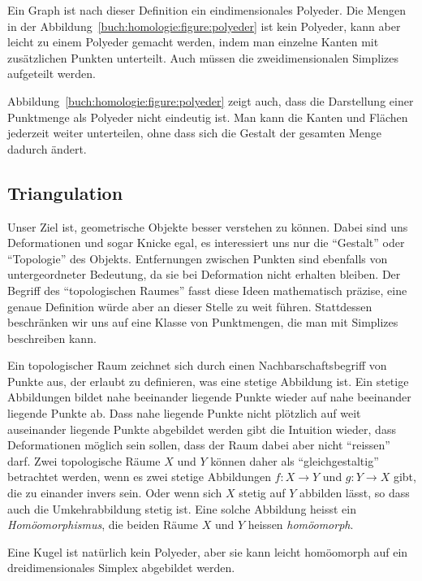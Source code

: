 Ein Graph ist nach dieser Definition ein eindimensionales Polyeder.
Die Mengen in der Abbildung~\ref{buch:homologie:figure:polyeder}
ist kein Polyeder, kann aber leicht zu einem Polyeder gemacht werden,
indem man einzelne Kanten mit zusätzlichen Punkten unterteilt.
Auch müssen die zweidimensionalen Simplizes aufgeteilt werden.

Abbildung~\ref{buch:homologie:figure:polyeder} zeigt auch, dass
die Darstellung einer Punktmenge als Polyeder nicht eindeutig ist.
Man kann die Kanten und Flächen jederzeit weiter unterteilen, ohne
dass sich die Gestalt der gesamten Menge dadurch ändert.

\subsection{Triangulation
\label{buch:subsection:triangulation}}
Unser Ziel ist, geometrische Objekte besser verstehen zu können.
Dabei sind uns Deformationen und sogar Knicke egal, es interessiert uns
nur die ``Gestalt'' oder ``Topologie'' des Objekts.
Entfernungen zwischen Punkten sind ebenfalls von untergeordneter 
Bedeutung, da sie bei Deformation nicht erhalten bleiben.
Der Begriff des ``topologischen Raumes'' fasst diese Ideen mathematisch
präzise, eine genaue Definition würde aber an dieser Stelle zu weit
führen.
Stattdessen beschränken wir uns auf eine Klasse von Punktmengen, die man
mit Simplizes beschreiben kann.

Ein topologischer Raum zeichnet sich durch einen Nachbarschaftsbegriff
von Punkte aus, der erlaubt zu definieren, was eine stetige Abbildung ist.
Ein stetige Abbildungen bildet nahe beeinander liegende Punkte wieder
auf nahe beeinander liegende Punkte ab.
Dass nahe liegende Punkte nicht plötzlich auf weit auseinander liegende
Punkte abgebildet werden gibt die Intuition wieder, dass Deformationen
möglich sein sollen, dass der Raum dabei aber nicht ``reissen'' darf.
Zwei topologische Räume $X$ und $Y$ können daher als ``gleichgestaltig''
betrachtet werden, wenn es zwei stetige Abbildungen $f\colon X\to Y$
und $g\colon Y\to X$ gibt, die zu einander invers sein.
Oder wenn sich $X$ stetig auf $Y$ abbilden lässt, so dass auch die
Umkehrabbildung stetig ist.
Eine solche Abbildung heisst ein {\em Homöomorphismus}, die beiden Räume
$X$ und $Y$ heissen {\em homöomorph}.

Eine Kugel ist natürlich kein Polyeder, aber sie kann leicht homöomorph
auf ein dreidimensionales Simplex abgebildet werden.

